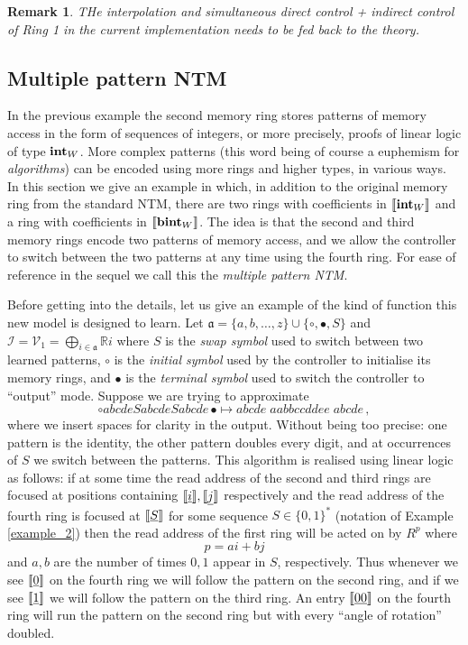\documentclass[english,letter paper,12pt,leqno]{article}
\theoremstyle{example}
\newtheorem{remark}[theorem]{Remark}
\numberwithin{equation}{section}
\def\be{\begin{equation}}
\def\ee{\end{equation}}
\begin{document}
\begin{remark} THe interpolation and simultaneous direct control + indirect control of Ring 1 in the current implementation needs to be fed back to the theory.
\end{remark}

\subsection{Multiple pattern NTM}\label{example:ntm_super}

In the previous example the second memory ring stores patterns of memory access in the form of sequences of integers, or more precisely, proofs of linear logic of type $\textbf{int}_W$. More complex patterns (this word being of course a euphemism for \emph{algorithms}) can be encoded using more rings and higher types, in various ways. In this section we give an example in which, in addition to the original memory ring from the standard NTM, there are two rings with coefficients in $\llbracket \textbf{int}_W \rrbracket$ and a ring with coefficients in $\llbracket \textbf{bint}_W \rrbracket$. The idea is that the second and third memory rings encode two patterns of memory access, and we allow the controller to switch between the two patterns at any time using the fourth ring. For ease of reference in the sequel we call this the \emph{multiple pattern NTM}.

Before getting into the details, let us give an example of the kind of function this new model is designed to learn. Let $\mathfrak{a} = \{a,b,\ldots,z\} \cup \{\circ, \bullet, S\}$ and $\mathscr{I} = \mathscr{V}_1 = \bigoplus_{i \in \mathfrak{a}} \mathbb{R} i$ where $S$ is the \emph{swap symbol} used to switch between two learned patterns, $\circ$ is the \emph{initial symbol} used by the controller to initialise its memory rings, and $\bullet$ is the \emph{terminal symbol} used to switch the controller to ``output'' mode. Suppose we are trying to approximate
\be\label{eq:example_seq_func}
\circ abcde S abcde S abcde \,\bullet \longmapsto abcde \; aabbccddee \; abcde\,,
\ee
where we insert spaces for clarity in the output. Without being too precise: one pattern is the identity, the other pattern doubles every digit, and at occurrences of $S$ we switch between the patterns. This algorithm is realised using linear logic as follows: if at some time the read address of the second and third rings are focused at positions containing $\llbracket \underline{i} \rrbracket, \llbracket \underline{j} \rrbracket$ respectively and the read address of the fourth ring is focused at $\llbracket \underline{S} \rrbracket$ for some sequence $S \in \{0,1\}^*$ (notation of Example \ref{example_2}) then the read address of the first ring will be acted on by $R^p$ where
\[
p = ai + bj
\]
and $a, b$ are the number of times $0,1$ appear in $S$, respectively. Thus whenever we see $\llbracket \underline{0} \rrbracket$ on the fourth ring we will follow the pattern on the second ring, and if we see $\llbracket \underline{1} \rrbracket$ we will follow the pattern on the third ring. An entry $\llbracket \underline{00} \rrbracket$ on the fourth ring will run the pattern on the second ring but with every ``angle of rotation'' doubled. 
\end{document}
